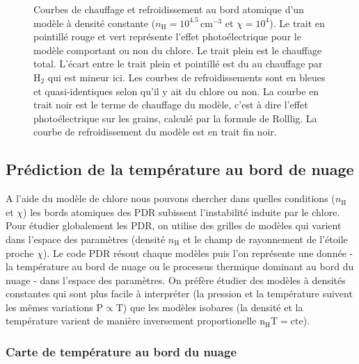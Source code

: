 \begin{figure}[!h]
\begin{subfigure}[t]{0.49\textwidth}
    \label{fig:Cl:modelPE:GC3}
    \end{subfigure}
    \caption{Courbes de chauffage et refroidissement au bord atomique d'un modèle à densité constante ($n_\mathrm{H} = 10^{4.5} \,\mathrm{cm}^{-3}$ et $\chi = 10^4$). Le trait en pointillé rouge et vert représente l'effet photoélectrique pour le modèle comportant ou non du chlore.  Le trait plein est le chauffage total. L'écart entre le trait plein et pointillé est du au chauffage par $\mathrm{H}_2$ qui est mineur ici. Les courbes de refroidissements sont en bleues et quasi-identiques selon qu'il y ait du chlore ou non. La courbe en trait noir est le terme de chauffage du modèle, c'est à dire l'effet photoélectrique sur les grains, calculé par la formule de Rolllig. La courbe de refroidissement du modèle est en trait fin noir.}
    
\end{figure}

\subsection{Prédiction de la température au bord de nuage}
 
A l'aide du modèle de chlore nous pouvons chercher dans quelles conditions ($n_\mathrm{H}$ et $\chi$) les bords atomiques des PDR subissent l'instabilité induite par le chlore. Pour étudier globalement les PDR, on utilise des grilles de modèles qui varient dans l'espace des paramètres (densité $n_\mathrm{H}$ et le champ de rayonnement de l'étoile proche $\chi$). Le code PDR résout chaque modèles puis l'on représente une donnée - la température au bord de nuage ou le processus thermique dominant au bord du nuage - dans l'espace des paramètres. On préfère étudier des modèles à densités constantes qui sont plus facile à interpréter (la pression et la température suivent les mêmes variations $\mathrm{P}\propto \mathrm{T}$) que les modèles isobares (la densité et la température varient de manière inversement proportionelle $\mathrm{n}_\mathrm{H}\mathrm{T}=\mathrm{cte}$). 


\subsubsection{Carte de température au bord du nuage}

